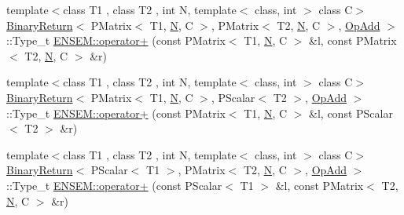 \begin{DoxyCompactItemize}
\item 
{\footnotesize template$<$class T1 , class T2 , int N, template$<$ class, int $>$ class C$>$ }\\\mbox{\hyperlink{structBinaryReturn}{Binary\+Return}}$<$ P\+Matrix$<$ T1, \mbox{\hyperlink{adat__devel_2lib_2hadron_2operator__name__util_8cc_a7722c8ecbb62d99aee7ce68b1752f337}{N}}, C $>$, P\+Matrix$<$ T2, \mbox{\hyperlink{adat__devel_2lib_2hadron_2operator__name__util_8cc_a7722c8ecbb62d99aee7ce68b1752f337}{N}}, C $>$, \mbox{\hyperlink{structOpAdd}{Op\+Add}} $>$\+::Type\+\_\+t \mbox{\hyperlink{group__primmatrix_ga14b22344862e687608f50a8386764f6d}{E\+N\+S\+E\+M\+::operator+}} (const P\+Matrix$<$ T1, \mbox{\hyperlink{adat__devel_2lib_2hadron_2operator__name__util_8cc_a7722c8ecbb62d99aee7ce68b1752f337}{N}}, C $>$ \&l, const P\+Matrix$<$ T2, \mbox{\hyperlink{adat__devel_2lib_2hadron_2operator__name__util_8cc_a7722c8ecbb62d99aee7ce68b1752f337}{N}}, C $>$ \&r)
\item 
{\footnotesize template$<$class T1 , class T2 , int N, template$<$ class, int $>$ class C$>$ }\\\mbox{\hyperlink{structBinaryReturn}{Binary\+Return}}$<$ P\+Matrix$<$ T1, \mbox{\hyperlink{adat__devel_2lib_2hadron_2operator__name__util_8cc_a7722c8ecbb62d99aee7ce68b1752f337}{N}}, C $>$, P\+Scalar$<$ T2 $>$, \mbox{\hyperlink{structOpAdd}{Op\+Add}} $>$\+::Type\+\_\+t \mbox{\hyperlink{group__primmatrix_gacd1e2ab4740e640c1aa2862faf4436db}{E\+N\+S\+E\+M\+::operator+}} (const P\+Matrix$<$ T1, \mbox{\hyperlink{adat__devel_2lib_2hadron_2operator__name__util_8cc_a7722c8ecbb62d99aee7ce68b1752f337}{N}}, C $>$ \&l, const P\+Scalar$<$ T2 $>$ \&r)
\item 
{\footnotesize template$<$class T1 , class T2 , int N, template$<$ class, int $>$ class C$>$ }\\\mbox{\hyperlink{structBinaryReturn}{Binary\+Return}}$<$ P\+Scalar$<$ T1 $>$, P\+Matrix$<$ T2, \mbox{\hyperlink{adat__devel_2lib_2hadron_2operator__name__util_8cc_a7722c8ecbb62d99aee7ce68b1752f337}{N}}, C $>$, \mbox{\hyperlink{structOpAdd}{Op\+Add}} $>$\+::Type\+\_\+t \mbox{\hyperlink{group__primmatrix_ga39561cdaedaf3bb4fb108575dae42de6}{E\+N\+S\+E\+M\+::operator+}} (const P\+Scalar$<$ T1 $>$ \&l, const P\+Matrix$<$ T2, \mbox{\hyperlink{adat__devel_2lib_2hadron_2operator__name__util_8cc_a7722c8ecbb62d99aee7ce68b1752f337}{N}}, C $>$ \&r)
\item 

\end{DoxyCompactItemize}
